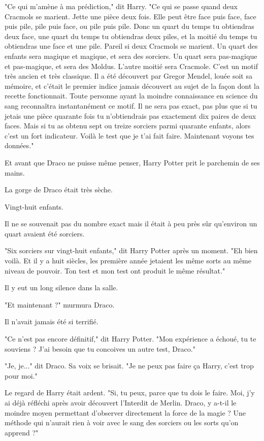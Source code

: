 "Ce qui m'amène à ma prédiction," dit Harry. "Ce qui se passe quand deux Cracmols se marient. Jette une pièce deux fois. Elle peut être face puis face, face puis pile, pile puis face, ou pile puis pile. Donc un quart du temps tu obtiendras deux face, une quart du temps tu obtiendras deux piles, et la moitié du temps tu obtiendras une face et une pile. Pareil si deux Cracmols se marient. Un quart des enfants sera magique et magique, et sera des sorciers. Un quart sera pas-magique et pas-magique, et sera des Moldus. L'autre moitié sera Cracmole. C'est un motif très ancien et très classique. Il a été découvert par Gregor Mendel, louée soit sa mémoire, et c'était le premier indice jamais découvert au sujet de la façon dont la recette fonctionnait. Toute personne ayant la moindre connaissance en science du sang reconnaîtra instantanément ce motif. Il ne sera pas exact, pas plus que si tu jetais une pièce quarante fois tu n'obtiendrais pas exactement dix paires de deux faces. Mais si tu as obtenu sept ou treize sorciers parmi quarante enfants, alors c'est un fort indicateur. Voilà le test que je t'ai fait faire. Maintenant voyons tes données."

Et avant que Draco ne puisse même penser, Harry Potter prit le parchemin de ses mains.

La gorge de Draco était très sèche.

Vingt-huit enfants.

Il ne se souvenait pas du nombre exact mais il était à peu près sûr qu'environ un quart avaient été sorciers.

"Six sorciers sur vingt-huit enfants," dit Harry Potter après un moment. "Eh bien voilà. Et il y a huit siècles, les première année jetaient les même sorts au même niveau de pouvoir. Ton test et mon test ont produit le même résultat."

Il y eut un long silence dans la salle.

"Et maintenant ?" murmura Draco.

Il n'avait jamais été si terrifié.

"Ce n'est pas encore définitif," dit Harry Potter. "Mon expérience a échoué, tu te souviens ? J'ai besoin que tu concoives un autre test, Draco."

"Je, je..." dit Draco. Sa voix se brisait. "Je ne peux pas faire ça Harry, c'est trop pour moi."

Le regard de Harry était ardent. "Si, tu peux, parce que tu dois le faire. Moi, j'y ai déjà réfléchi après avoir découvert l'Interdit de Merlin. Draco, y a-t-il le moindre moyen permettant d'observer directement la force de la magie ? Une méthode qui n'aurait rien à voir avec le sang des sorciers ou les sorts qu'on apprend ?"

